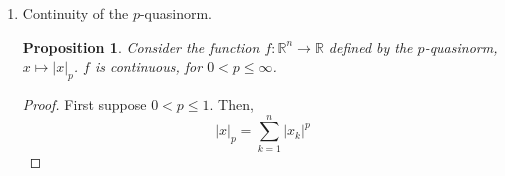 \documentclass[letterpaper,11pt]{article}
\newtheorem{prop}{Proposition}
\newcommand{\R}{\mathbb{R}}
\begin{document}
\begin{enumerate}
\begin{enumerate}
\begin{proof}
                    Since $|f(x) - f(y)| \leq h(|x - y|_\infty)$ for all
                    $x, y \in K$, we can replace $x$ here with any element of
                    $S$ to get
                    \begin{equation*}
                        0 \leq |f(x^{(i)}) - f(y)| < h(|x^{(i)} - y|_\infty)
                    \end{equation*}
                    for any $i$.

                    Notice that since $\{x^{(i)}\} \to y$,
                    $\{|x^{(i)} - y|_\infty\} \to 0$ as $i \to \infty$, so
                    $\{h(|x^{(i)} - y|_\infty\} \to 0$ as $i \to \infty$
                    because $h(t) = o(1)$.

                    By the Squeeze Theorem,
                    \begin{equation*}
                        \lim_{i\to\infty} {|f(x^{(i)} - f(y)|} = 0
                    \end{equation*}
                    so $\{f(x^{(i)})\} \to f(y)$, and $f(x) = f(y) + o(1)$.

                    This shows that $f$ is continuous.
                \end{proof}

            \item Continuity of the $p$-quasinorm.

                \begin{prop}
                    Consider the function $f : \R^n \to \R$ defined by the
                    $p$-quasinorm, $x \mapsto |x|_p$. $f$ is continuous, for
                    $0 < p \leq \infty$.
                \end{prop}

                \begin{proof}
                    First suppose $0 < p \leq 1$. Then,
                    \begin{equation*}
                        |x|_p = \sum_{k=1}^n |x_k|^p
                    \end{equation*}


\end{proof}
\end{enumerate}
\end{enumerate}
\end{document}
